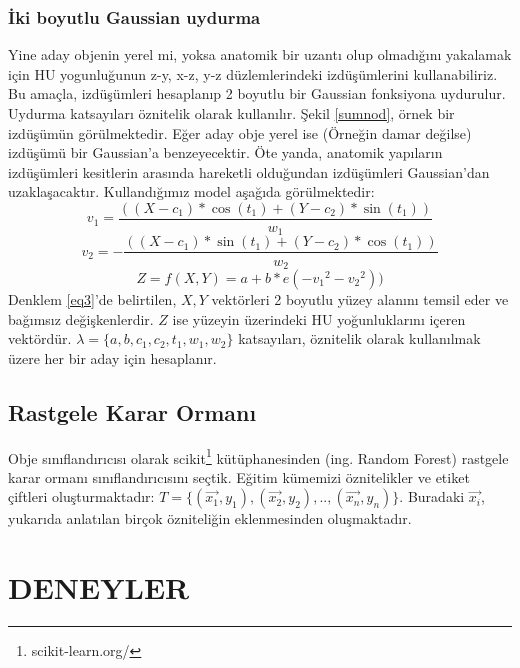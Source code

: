 \documentclass[conference]{IEEEtran}
\begin{document}
\subsubsection{İki boyutlu Gaussian uydurma}
Yine aday objenin yerel mi, yoksa anatomik bir uzantı olup olmadığını yakalamak için HU yogunluğunun z-y, x-z, y-z düzlemlerindeki izdüşümlerini kullanabiliriz. Bu amaçla, izdüşümleri hesaplanıp 2 boyutlu bir Gaussian fonksiyona uydurulur. Uydurma katsayıları öznitelik olarak kullanılır. Şekil \ref{sumnod}, örnek bir izdüşümün görülmektedir. Eğer aday obje yerel ise (Örneğin damar değilse) izdüşümü bir Gaussian'a benzeyecektir. Öte yanda, anatomik yapıların izdüşümleri kesitlerin arasında hareketli olduğundan izdüşümleri Gaussian'dan uzaklaşacaktır. 
Kullandığımız model aşağıda görülmektedir: 
\begin{equation}
v_1 = \frac{((X-c_1) * \cos(t_1) + (Y-c_2) * \sin(t_1))}{w_1}
\label{eq1}
\end{equation}
\begin{equation}
v_2 = -\frac{((X-c_1) * \sin(t_1) + (Y-c_2) * \cos(t_1))}{w_2}
\label{eq2}
\end{equation}
\begin{equation}
Z = f(X, Y) = a + b * e({-v_1}^2 - {v_2}^2))
\label{eq3}
\end{equation}
Denklem \ref{eq3}'de belirtilen, $X, Y$ vektörleri 2 boyutlu yüzey alanını temsil eder ve bağımsız değişkenlerdir. $Z$ ise yüzeyin üzerindeki HU yoğunluklarını içeren vektördür. $\lambda = \lbrace a, b, c_1, c_2, t_1, w_1, w_2 \rbrace$ katsayıları, öznitelik olarak kullanılmak üzere her bir aday için hesaplanır.

\subsection{Rastgele Karar Ormanı}
Obje sınıflandırıcısı olarak scikit\footnote{scikit-learn.org/} kütüphanesinden (ing. Random Forest) rastgele karar ormanı sınıflandırıcısını seçtik. Eğitim kümemizi öznitelikler ve etiket çiftleri oluşturmaktadır: $T = \lbrace (\vec{x_1}, y_1), (\vec{x_2}, y_2), .., (\vec{x_n}, y_n) \rbrace$. Buradaki $\vec{x_i}$, yukarıda anlatılan birçok özniteliğin eklenmesinden oluşmaktadır.

\section{DENEYLER}
\end{document}
